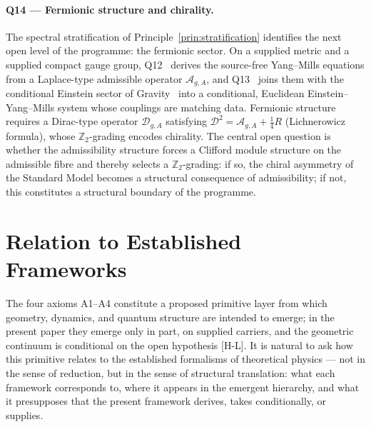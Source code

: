 \documentclass[11pt,a4paper]{article}
\begin{document}
    \paragraph{Q14 --- Fermionic structure and chirality.}
      The spectral stratification of Principle~\ref{prin:stratification} identifies
      the next open level of the programme: the fermionic sector.
      On a supplied metric and a supplied compact gauge group, Q12~\cite{Beau2026q12} derives the source-free
      Yang--Mills equations from a Laplace-type admissible operator $\mathcal{A}_{g,A}$, and
      Q13~\cite{Beau2026q13} joins them with the conditional Einstein sector of Gravity~\cite{Beau2026h}
      into a conditional, Euclidean Einstein--Yang--Mills system whose couplings are matching data.
      Fermionic structure requires a Dirac-type operator $\mathcal{D}_{g,A}$
      satisfying $\mathcal{D}^2 = \mathcal{A}_{g,A} + \tfrac{1}{4}R$
      (Lichnerowicz formula), whose $\mathbb{Z}_2$-grading encodes chirality.
      The central open question is whether the admissibility structure forces a
      Clifford module structure on the admissible fibre and thereby selects a
      $\mathbb{Z}_2$-grading: if so, the chiral asymmetry of the Standard Model
      becomes a structural consequence of admissibility; if not, this constitutes
      a structural boundary of the programme.

      \clearpage
  \section{Relation to Established Frameworks}
  \label{sec:frameworks}

  The four axioms A1--A4 constitute a proposed primitive layer from which geometry, dynamics,
  and quantum structure are intended to emerge; in the present paper they emerge only in part, on supplied
  carriers, and the geometric continuum is conditional on the open hypothesis [H-L].
  It is natural to ask how this primitive relates to the established formalisms of
  theoretical physics — not in the sense of reduction, but in the sense of structural
  translation: what each framework corresponds to, where it appears in the emergent
  hierarchy, and what it presupposes that the present framework derives, takes conditionally, or supplies.
\end{document}
